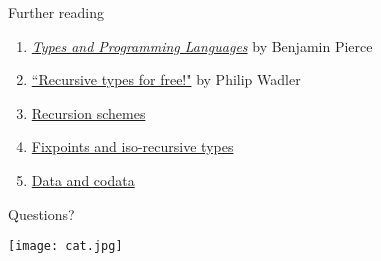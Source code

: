 \documentclass[10pt]{beamer}
\begin{document}
\begin{frame}[fragile]{Further reading}
  \begin{enumerate}
    \item \href{https://mitpress.mit.edu/books/types-and-programming-languages}{\emph{Types and Programming Languages}} by Benjamin Pierce
    \item \href{http://homepages.inf.ed.ac.uk/wadler/papers/free-rectypes/free-rectypes.txt}{``Recursive types for free!"} by Philip Wadler
    \item \href{http://blog.sumtypeofway.com/an-introduction-to-recursion-schemes/}{Recursion schemes}
    \item \href{https://jozefg.bitbucket.io/posts/2013-11-09-iso-recursive-types.html}{Fixpoints and iso-recursive types}
    \item \href{http://types2004.lri.fr/SLIDES/altenkirch.pdf}{Data and codata}
  \end{enumerate}
\end{frame}

\begin{frame}[fragile]{Questions?}
  \graphicspath{ {/Users/esther_wang/Desktop/} }
  \texttt{[image: cat.jpg]}
\end{frame}
\end{document}

